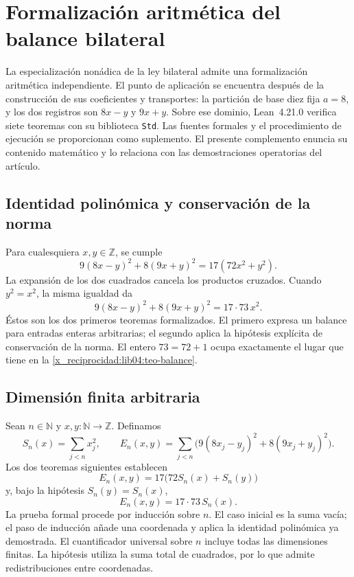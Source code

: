 \chapter*{Formalización aritmética del balance bilateral}
\label{x_reciprocidad:libro:formalizacion-lean}

La especialización nonádica de la ley bilateral admite una formalización
aritmética independiente. El punto de aplicación se encuentra después de la
construcción de sus coeficientes y transportes: la partición de base diez fija
\(a=8\), y los dos registros son \(8x-y\) y \(9x+y\). Sobre ese dominio,
Lean~4.21.0 verifica siete teoremas con su biblioteca \texttt{Std}. Las fuentes
formales y el procedimiento de ejecución se proporcionan como suplemento.
El presente complemento enuncia su contenido matemático y lo relaciona con
las demostraciones operatorias del artículo.

\section*{Identidad polinómica y conservación de la norma}

Para cualesquiera \(x,y\in\mathbb Z\), se cumple
\[
 9(8x-y)^2+8(9x+y)^2=17(72x^2+y^2).
\]
La expansión de los dos cuadrados cancela los productos cruzados. Cuando
\(y^2=x^2\), la misma igualdad da
\[
 9(8x-y)^2+8(9x+y)^2=17\cdot73\,x^2.
\]
Éstos son los dos primeros teoremas formalizados. El primero expresa un
balance para entradas enteras arbitrarias; el segundo aplica la hipótesis
explícita de conservación de la norma. El entero \(73=72+1\) ocupa
exactamente el lugar que tiene en la \cref{x_reciprocidad:lib04:teo-balance}.

\section*{Dimensión finita arbitraria}

Sean \(n\in\mathbb N\) y \(x,y:\mathbb N\to\mathbb Z\). Definamos
\[
 S_n(x)=\sum_{j<n}x_j^2,
 \qquad
 E_n(x,y)=\sum_{j<n}\bigl(9(8x_j-y_j)^2+8(9x_j+y_j)^2\bigr).
\]
Los dos teoremas siguientes establecen
\[
 E_n(x,y)=17\bigl(72S_n(x)+S_n(y)\bigr)
\]
y, bajo la hipótesis \(S_n(y)=S_n(x)\),
\[
 E_n(x,y)=17\cdot73\,S_n(x).
\]
La prueba formal procede por inducción sobre \(n\). El caso inicial es la
suma vacía; el paso de inducción añade una coordenada y aplica la identidad
polinómica ya demostrada. El cuantificador universal sobre \(n\) incluye
todas las dimensiones finitas. La hipótesis utiliza la suma total de
cuadrados, por lo que admite redistribuciones entre coordenadas.

